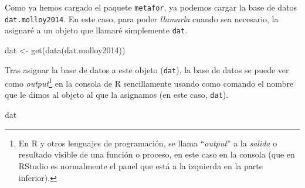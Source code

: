\documentclass[
  bookmarksnumbered]{article}
\newenvironment{Shaded}{\begin{snugshade}}{\end{snugshade}}
\newcommand{\FunctionTok}[1]{\textcolor[rgb]{0.39,0.29,0.61}{#1}}
\newcommand{\NormalTok}[1]{\textcolor[rgb]{0.12,0.11,0.11}{#1}}
\newcommand{\OtherTok}[1]{\textcolor[rgb]{0.00,0.43,0.16}{#1}}
\begin{document}
Como ya hemos cargado el paquete \texttt{metafor}, ya podemos cargar la base de datos \texttt{dat.molloy2014}. En este caso, para poder \emph{llamarla} cuando sea necesario, la asignaré a un objeto que llamaré simplemente \texttt{dat}.

\begin{Shaded}
\begin{Highlighting}[]
\NormalTok{dat }\OtherTok{\textless{}{-}} \FunctionTok{get}\NormalTok{(}\FunctionTok{data}\NormalTok{(dat.molloy2014))}
\end{Highlighting}
\end{Shaded}

Tras asignar la base de datos a este objeto (\texttt{dat}), la base de datos se puede ver como \emph{output}\footnote{En R y otros lenguajes de programación, se llama ``\emph{output}'' a la \emph{salida} o resultado visible de una función o proceso, en este caso en la consola (que en RStudio es normalmente el panel que está a la izquierda en la parte inferior).} en la consola de R sencillamente usando como comando el nombre que le dimos al objeto al que la asignamos (en este caso, \texttt{dat}).

\begin{Shaded}
\begin{Highlighting}[]
\NormalTok{dat}
\end{Highlighting}
\end{Shaded}
\end{document}
